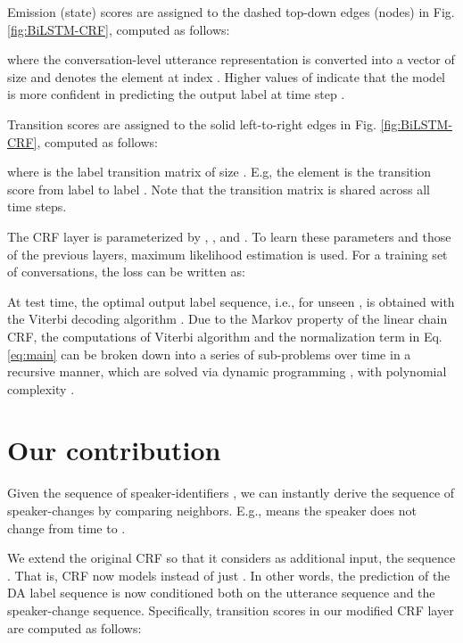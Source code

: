 \documentclass[11pt,a4paper]{article}
\begin{document}
\noindent Emission (state) scores are assigned to the dashed top-down edges (nodes) in Fig. \ref{fig:BiLSTM-CRF}, computed as follows:

{\small
\setlength{\abovedisplayskip}{-3pt}
\setlength{\belowdisplayskip}{3pt}

}

\noindent where the conversation-level utterance representation  is converted into a vector of size  and  denotes the element at index .
Higher values of  indicate that the model is more confident in predicting the output label  at time step .

\noindent Transition scores are assigned to the solid left-to-right edges in Fig. \ref{fig:BiLSTM-CRF}, computed as follows:

{\small
\setlength{\abovedisplayskip}{-3pt}
\setlength{\belowdisplayskip}{3pt}

}

\noindent where  is the label transition matrix of size .
E.g, the element  is the transition score from label  to label .
Note that the transition matrix is shared across all time steps.

The CRF layer is parameterized by , , and .
To learn these parameters and those of the previous layers, maximum likelihood estimation is used.
For a training set of  conversations, the loss can be written as:

{\small
\setlength{\abovedisplayskip}{-3pt}
\setlength{\belowdisplayskip}{3pt}

}

\noindent At test time, the optimal output label sequence, i.e.,  for unseen , is obtained with the Viterbi decoding algorithm \citep{viterbi1967error}.
Due to the Markov property of the linear chain CRF, the computations of Viterbi algorithm and the normalization term in Eq. \ref{eq:main} can be broken down into a series of sub-problems over time in a recursive manner, which are solved via dynamic programming \citep{bellman1966dynamic}, with polynomial complexity .

\section{Our contribution}
Given the sequence of speaker-identifiers , we can instantly derive the sequence of speaker-changes  by comparing neighbors. E.g.,  means the speaker does not change from time  to . 

We extend the original CRF so that it considers as additional input, the sequence .
That is, CRF now models  instead of just .
In other words, the prediction of the DA label sequence is now conditioned both on the utterance sequence and the speaker-change sequence.
Specifically, transition scores in our modified CRF layer are computed as follows:
\end{document}
